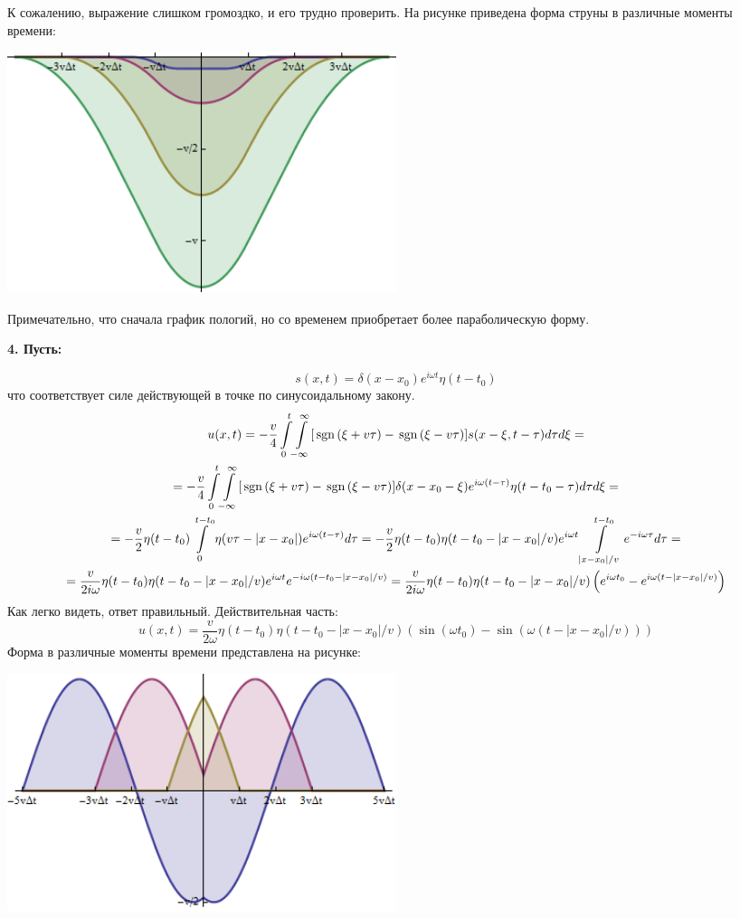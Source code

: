 К сожалению, выражение слишком громоздко, и его трудно проверить. На рисунке приведена форма струны в различные моменты времени:
\begin{center}
	\includegraphics[width=0.5\textwidth]{images/png/for_const_force.png}
\end{center}
Примечательно, что сначала график пологий, но со временем приобретает более параболическую форму.

\textbf{4. Пусть:}

\[
s(x, t) = \delta(x - x_0) e^{i\omega t} \eta(t - t_0)
\]
что соответствует силе действующей в точке по синусоидальному закону.
\[
\begin{gathered}
u(x, t) =
-\frac{v}{4} \int\limits_{0}^{t} \! \int\limits_{-\infty}^{\infty} [ \mathrm{\,sgn}\, (\xi + v \tau) - \mathrm{\,sgn}\, (\xi - v\tau) ] s(x - \xi, t - \tau) d\tau d\xi =
\\ =
-\frac{v}{4} \int\limits_{0}^{t} \! \int\limits_{-\infty}^{\infty} [ \mathrm{\,sgn}\, (\xi + v \tau) - \mathrm{\,sgn}\, (\xi - v\tau) ] \delta(x - x_0 - \xi) e^{i\omega(t - \tau)} \eta(t - t_0 - \tau) d\tau d\xi =
\\ =
-\frac{v}{2} \eta(t - t_0) \int\limits_{0}^{t - t_0} \eta(v\tau - |x - x_0|) e^{i\omega(t - \tau)} d\tau =
-\frac{v}{2} \eta(t - t_0) \eta(t - t_0 - |x -x_0|/v) e^{i\omega t} \int\limits_{|x - x_0|/v}^{t - t_0} e^{-i\omega\tau} d\tau =
\\ =
\frac{v}{2i\omega} \eta(t - t_0) \eta(t - t_0 - |x -x_0|/v) e^{i\omega t} e^{-i\omega(t - t_0 - |x - x_0|/v)} =
\frac{v}{2i\omega} \eta(t - t_0) \eta(t - t_0 - |x -x_0|/v) \left(e^{i\omega t_0} - e^{i\omega(t - |x - x_0|/v)} \right)
\end{gathered}
\]
Как легко видеть, ответ правильный. Действительная часть:
\[
	u(x, t) = \frac{v}{2\omega} \eta(t - t_0) \eta(t - t_0 - |x -x_0|/v) \left(\sin (\omega t_0) - \sin(\omega(t - |x - x_0|/v)) \right)
\]
Форма в различные моменты времени представлена на рисунке:
\begin{center}
	\includegraphics[width=0.5\textwidth]{images/png/for_sin_force.png}
\end{center}

